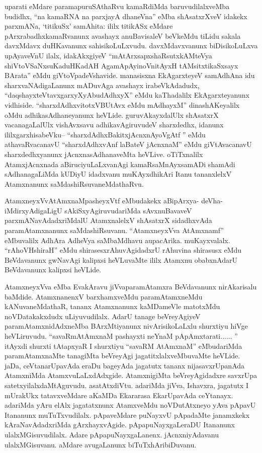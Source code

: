 \begin{artha}
uparati eMdare paramapuruSAthaRvu kamaRdiMda baruvudilalxveMba budidhx, ``na kamaRNA na parxjayA dhaneVna'' eMba shAsatxrXveV idakekx parxmANa, `titikuSx' samAhita: ililx titikASx eMdare pArxrabadhxkamaRvanunx avashayx anuBavisaleV beVkeMdu tiLidu sakala davxMdavx duHKavanunx sahisikoLuLxvudu. davxMdavxvanunx biDisikoLuLxva upAyaveVnU ilalx, idakAkxgiyeV ``mAtArxsapxshaRsutxkAMteVya shiVtoVSaNxsuKaduHKadAH AgamApAyinoV\s nitAyxH tAMsitxtikaSxsayx BArata'' eMdu giVtoVpadeVshavide. manasisxna EkAgarxteyeV samAdhAna idu sharxvaNAdigaLanunx mADuvAga avashayx irabeVkAdadudx, ``daqshayxteVtavxgarxyXyAbudAdhxyX'' eMdu kaThadalilx EkAgarxteyanunx vidhiside. ``sharxdAdhxvitotxVBUtAvx eMdu mAdhayxM'' dinashAKeyalilx oMdu adhikasAdhaneyanunx heVLide. guruvAkayxdalUlx shAsatxrX vacanagaLalUlx vishAvxsavu adhikavAgiruvudeV sharxdedhx, idanunx ililxgarxhisabeVku{\rm --} ``sharxdAdhxBakitxjAcnxnAyoVgAtf '' eMdu athavaRvacanavU ``sharxdAdhxvAnf laBateV jAcnxnaM'' eMdu giVtAvacanavU sharxdedhxyanunx jAcnxnasAdhanaveMta heVLive. oTiTxnalilx AtamxjAcnxnada aBiruciyuLaLxvanAgi kamaRsaMnAyxsamADi shamAdi sAdhanagaLiMda kUDiyU idadxvanu muKAyxdhikAri Itanu tananxlelxV Atamxnanunx saMdashiRsuvaneMdathaRvu.
\end{artha}

\begin{artha}
AtamxneyxVvAtAmxnaMpasheyxVtf eMbudakekx aBipArxya- deVha- iMdirxyAdigaLigU sAkiSxyAgiruvudariMda sAvxnuBavaveV parxmANavAdadxriMdalU AtamxnalelxV shAsatxrX sidadhxvAda paramAtamxnanunx saMdashiRsuvanu. ``AtamxneyxVva AtAmxnamf'' eMbuvalilx AdhAra AdheVya saMbaMdhavu aupacArika. muKayxvalalx. ``rAhoVHshiraH'' eMdu shirasesxrAhuvAgidadxrU rAhuvina shirasusx eMdu BeVdavanunx gwNavAgi kalipxsi heVLuvaMte ililx Atamxnu obabxnAdarU BeVdavanunx kalipxsi heVLide.
\end{artha}

\begin{artha}
AtamxneyxVva eMba EvakAravu jiVvaparamAtamxra BeVdavanunx nirAkarisalu baMdide. AtamxnanenxV barxhamxveMdu paramAtamxneMdu kANuvaneMdathaR, tananx Atamxnanunx kaMDameVle matotxMdu noVDatakakxdudx uLiyuvudilalx. AdarU tanage beVreyAgiyeV paramAtamxnidAdxneMba BArxMtiyanunx nivArisikoLaLxlu shurxtiyu hiVge heVLiruvudu. ``savaRmAtAmxnaM pashayxti neYnaM pApAmxtarati...... '' itAyxdi shurxti tAtapxyaR I shurxtiyu ``savaRM AtAmxnaM'' eMbudariMda paramAtamxnaMte tanagiMta beVreyAgi jagatitxlalxveMbuvaMte heVLide. jaDa, ceVtanarUpavAda eraDu bageyAda jagatutx tananx nijasavxrUpanAda AtamxniMda AtamxvuLaLxdAdxgide. AtamxnigiMta beVreyAgidadxre savxrUpa satetxyilalxdaMtAguvudu. asatAtxdiVtu. adariMda jiVva, Ishavxra, jagatutx I mUrakUkx tatavxveMdare aKaMDa Ekararasa EkarUpavAda ceYtanayx. adariMda yAru elAlx jagatatxnunx AtamxveMdu noVDutAtxneyo yAva pApavU Itananunx muTuTxvudilalx. pApaveMdare puNayxvU pApadaMte janamxkekx kAraNavAdadxriMda gArxhayxvAgide. pApapuNayxgaLeraDU Itananunx ulalxMGisuvudilalx. Adare pApapuNayxgaLanenx. jAcnxniyAdavanu ulalxMGisuvanu. aMdare avugaLanunx biTuTxhAribiDuvanu. 
\end{artha}

